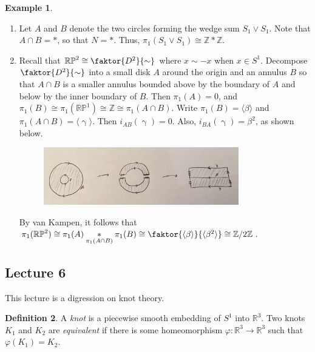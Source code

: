 \documentclass[10pt,letterpaper,cm]{nupset}
\theoremstyle{definition}
\newtheorem{definition}{Definition}[subsection]
\newtheorem{exmp}[definition]{Example}
\theoremstyle{theorem}
\theoremstyle{remark}
\newcommand{\R}{\mathbb{R}}
\newcommand{\RP}{\mathbb{RP}}
\newcommand{\Z}{\mathbb Z}
\newcommand{\1}{\mathbb{1}}
\newcommand{\0}{\vec 0}
\begin{document}
\begin{exmp} $ $
\begin{enumerate}
\item  Let $A$ and $B$ denote the two circles forming the wedge sum $S_1 \vee S_1$.  Note that $A\cap B = \ast$, so that $N=\ast$. Thus, $\pi_1(S_1 \vee S_1) \cong \Z \ast \Z$.
\item Recall that $\RP^2 \cong \faktor{D^2}{\sim}$ where $x\sim -x$ when $x\in S^1$. Decompose $\faktor{D^2}{\sim}$ into a small disk $A$ around the origin and an annulus $B$ so that $A \cap B$ is a smaller annulus bounded above by the boundary of $A$ and below by the inner boundary of $B$. Then $\pi_1(A) =0$, and $\pi_1(B) \cong \pi_1(\RP^1) \cong  \Z \cong \pi_1(A \cap B)$. Write $\pi_1(B) = \langle \beta \rangle$ and $\pi_1(A \cap B) = \langle \upgamma \rangle$. Then $i_{AB}(\upgamma) =0$. Also, $i_{BA}(\upgamma) = \beta^2$, as shown below.
\begin{figure}[H]
\centering
\includegraphics[width=85mm]{RP2.jpg}
\end{figure}
By van Kampen, it follows that $\pi_1(\RP^2) \cong \pi_1(A) \underset{\pi_1(A \cap B)}{\ast} \pi_1(B) \cong \faktor{\langle \beta \rangle}{\langle \beta^2 \rangle} \cong \Z / 2 \Z$.
\end{enumerate}
\end{exmp}



\subsection{Lecture 6}

This lecture is a digression on knot theory.

\begin{definition}
A \textit{knot} is a piecewise smooth embedding of $S^1$ into $\R^3$. Two knots $K_1$ and $K_2$ are \textit{equivalent} if there is some homeomorphism $\varphi : \R^3 \to \R^3$ such that $\varphi(K_1) = K_2$.
\end{definition}
\end{document}
